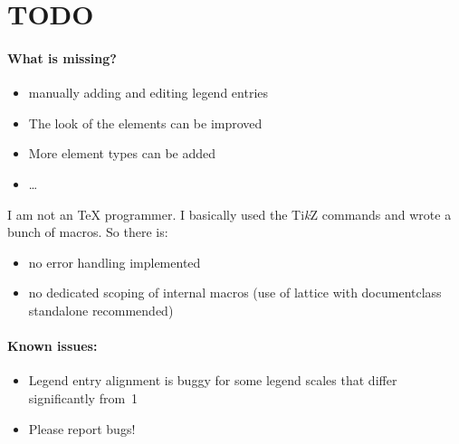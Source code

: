 \documentclass[a4paper]{scrartcl}
\newcommand{\tikzlabel}{Ti\textit{k}Z}
\begin{document}
\clearpage
\section{TODO}
\label{sec:todo}

\paragraph{What is missing?}
\begin{itemize}
\item manually adding and editing legend entries
\item The look of the elements can be improved
\item More element types can be added
\item \ldots{}
\end{itemize}

I am not an \TeX{} programmer. I basically used the \tikzlabel{} commands and wrote a
bunch of macros. So there is:
\begin{itemize}
\item no error handling implemented
\item no dedicated scoping of internal macros (use of lattice with documentclass standalone recommended)
\end{itemize}

\paragraph{Known issues:}
\begin{itemize}
\item Legend entry alignment is buggy for some legend scales that differ significantly
  from~1
\item Please report bugs!
\end{itemize}
\end{document}
